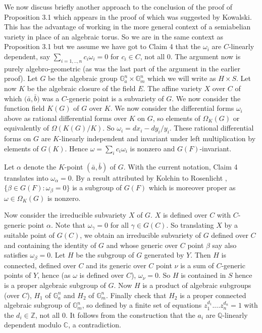 \documentclass[12pt]{article}
\newcommand{\Q}{\mathbb Q}  \newcommand{\Qq}{\mathbb Q}
\newcommand{\Z}{\mathbb Z}  \newcommand{\Zz}{\mathbb Z}
\newcommand{\C}{\mathbb C}
\begin{document}
\vspace{5mm}
\noindent
We now discuss briefly  another approach to the conclusion of the proof of Proposition 3.1 which appears in \cite{Kirby}  the proof of which was suggested by Kowalski. This has the advantage of working in the more general context of a semiabelian variety in place of an algebraic torus. 
So we are in the same context as Proposition 3.1 but we assume we have got to Claim 4 that the $\omega_{i}$ are $C$-linearly dependent, say $\sum_{i=1,..,n} c_{i}\omega_{i} =0$ for $c_{i}\in C$, not all $0$. The argument now is purely algebro-geometric (as was the last part of the argument in the earlier proof).
Let $G$ be the algebraic group ${\mathbb G}_{a}^{n}\times {\mathbb G}_{m}^{n}$ which we will write as $H\times S$. 
Let now $K$ be the algebraic closure of the field $E$. 
The affine variety $X$ over $C$ of which ${(\bar a}, {\bar b})$ was a $C$-generic point is a subvariety of $G$.
We now consider the function field  $K(G)$ of $G$ over $K$.
We now consider the differential forms $\omega_{i}$ above as rational differential forms over $K$ on $G$, so elements of $\Omega_{K}(G)$ or equivalently of $\Omega(K(G)/K)$. So $\omega_{i} = dx_{i} - dy_{i}/y_{i}$.  These rational differential forms on $G$ are $K$-linearly independent and invariant under left multiplication by elements of $G(K)$. Hence $\omega = \sum_{i}c_{i}\omega_{i}$ is nonzero and $G(F)$-invariant. 


Let $\alpha$ denote the $K$-point $({\bar a}, {\bar b})$ of $G$.  With the current notation, Claim 4 translates into  $\omega_{\alpha} = 0$.  By a result attributed by Kolchin \cite{Kolchin} to Rosenlicht \cite{Rosenlicht},
$\{\beta\in G(F): \omega_{\beta} = 0\}$ is a subgroup  of $G(F)$ which is moreover proper as $\omega\in \Omega_{K}(G)$ is nonzero. 

Now consider the irreducible subvariety $X$ of $G$. $X$ is defined over $C$ with $C$-generic point $\alpha$. Note that $\omega_{\gamma} = 0$ for all $\gamma\in G(C)$. So  translating $X$ by a suitable point of $G(C)$, we obtain an irreducible subvariety of $G$ defined over $C$ and containing the identity of $G$ and whose generic over $C$ point $\beta$ say also satisfies $\omega_{\beta} = 0$.  Let $H$ be the subgroup of $G$ generated by $Y$.  Then $H$ is connected, defined over $C$  and its generic over $C$ point $\nu$ is a sum of $C$-generic points of $Y$, hence (as $\omega$ is defined over $C$), $\omega_{\nu} = 0$. So $H$ is contained in $S$ hence is a proper algebraic subgroup of $G$.  Now $H$ is a product of algebraic subgroups (over $C$), $H_{1}$ of ${\mathbb G}_{a}^{n}$ and $H_{2}$ of ${\mathbb G}_{m}^{n}$.  Finally check that $H_{2}$ is a proper connected algebraic subgroup of ${\mathbb G}_{m}^{n}$,  so defined by a finite set of equations $z_{1}^{d_{1}}....z_{n}^{d_{n} } = 1$ with the $d_{i}\in \Z$,  not all $0$. It follows from the construction that the $a_{i}$ are $\Q$-linearly dependent modulo $\C$, a contradiction. 
\end{document}
